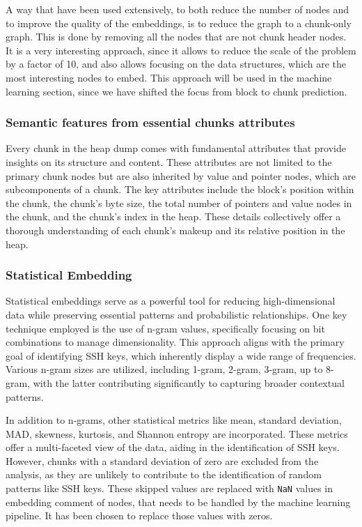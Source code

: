 A way that have been used extensively, to both reduce the number of nodes and to improve the quality of the embeddings, is to reduce the graph to a chunk-only graph. This is done by removing all the nodes that are not chunk header nodes. It is a very interesting approach, since it allows to reduce the scale of the problem by a factor of 10, and also allows focusing on the data structures, which are the most interesting nodes to embed. This approach will be used in the machine learning section, since we have shifted the focus from block to chunk prediction.

\subsubsection{Semantic features from essential chunks attributes}

Every chunk in the heap dump comes with fundamental attributes that provide insights on its structure and content. These attributes are not limited to the primary chunk nodes but are also inherited by value and pointer nodes, which are subcomponents of a chunk. The key attributes include the block's position within the chunk, the chunk's byte size, the total number of pointers and value nodes in the chunk, and the chunk's index in the heap. These details collectively offer a thorough understanding of each chunk's makeup and its relative position in the heap.

\subsubsection{Statistical Embedding}

Statistical embeddings serve as a powerful tool for reducing high-dimensional data while preserving essential patterns and probabilistic relationships. One key technique employed is the use of n-gram values, specifically focusing on bit combinations to manage dimensionality. This approach aligns with the primary goal of identifying SSH keys, which inherently display a wide range of frequencies. Various n-gram sizes are utilized, including 1-gram, 2-gram, 3-gram, up to 8-gram, with the latter contributing significantly to capturing broader contextual patterns. 

In addition to n-grams, other statistical metrics like mean, standard deviation, MAD, skewness, kurtosis, and Shannon entropy are incorporated. These metrics offer a multi-faceted view of the data, aiding in the identification of SSH keys. However, chunks with a standard deviation of zero are excluded from the analysis, as they are unlikely to contribute to the identification of random patterns like SSH keys. These skipped values are replaced with \texttt{NaN} values in embedding comment of nodes, that needs to be handled by the machine learning pipeline. It has been chosen to replace those values with zeros. 

